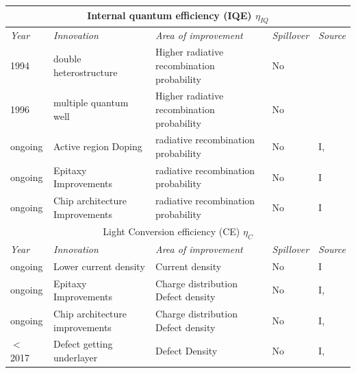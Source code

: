 \documentclass[10pt]{article}
\begin{document}
\begin{table}[H]
\begin{tabularx}{\textwidth}{ |l|X|X|l|l| }
        \multicolumn{5}{c}{Internal quantum efficiency (IQE) $\eta_{IQ}$} \\
        \hline
            \textit{Year} & \textit{Innovation} & \textit{Area of improvement} & \textit{Spillover} & \textit{Source} \\
        \hline
            1994 & double heterostructure & Higher radiative recombination probability & No & \cite{Nakamura1994} \\
        \hline
            1996 & multiple quantum well & Higher radiative recombination probability & No & \cite{Koike1996} \\
        \hline
            ongoing & Active region \newline Doping & radiative recombination probability & No & I, \cite{schubert2018light} \\
        \hline
            ongoing & Epitaxy \newline Improvements & radiative recombination probability & No & I \\
        \hline
            ongoing & Chip architecture \newline Improvements & radiative recombination probability & No & I \\
        \hline
        \multicolumn{5}{c}{Light Conversion efficiency (CE) $\eta_{C}$} \\
        \hline
            \textit{Year} & \textit{Innovation} & \textit{Area of improvement} & \textit{Spillover} & \textit{Source} \\
        \hline
            ongoing & Lower current density & Current density & No & I \\
        \hline
            ongoing & Epitaxy \newline Improvements & Charge distribution \newline Defect density & No & I, \cite{bhardwaj2016progress} \\
        \hline
            ongoing & Chip architecture \newline improvements  & Charge distribution \newline Defect density & No & I, \cite{Wildeson2017} \\
        \hline
            $<$ 2017 & Defect getting \newline underlayer & Defect Density & No & I, \cite{haller2017burying} \\
        \hline
        \end{tabularx}

\end{table}
\end{document}
